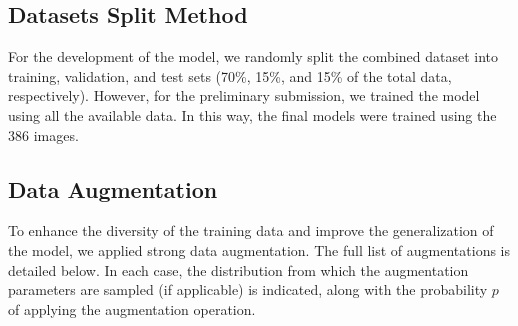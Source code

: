 \documentclass{article}
\begin{document}
\subsection{Datasets Split Method}

For the development of the model, we randomly split the combined dataset into training, validation, and test sets (70\%, 15\%, and 15\% of the total data, respectively).
However, for the preliminary submission, we trained the model using all the available data.
In this way, the final models were trained using the 386 images.

\subsection{Data Augmentation}

To enhance the diversity of the training data and improve the generalization of the model, we applied strong data augmentation.
The full list of augmentations is detailed below.
In each case, the distribution from which the augmentation parameters are sampled (if applicable) is indicated, along with the probability $p$ of applying the augmentation operation.
\end{document}

